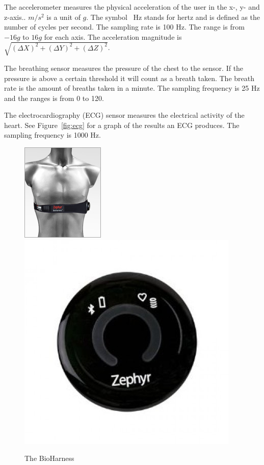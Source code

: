 			The accelerometer measures the physical acceleration of the user in the x-, y- and z-axis.. $m/s^2$ is a unit of $g$.	The symbol \SI{}{\hertz} stands for hertz and is defined as the number of cycles per second. The sampling rate is 100 Hz. The range is from $-16g$ to $16g$ for each axis. The acceleration magnitude is $\sqrt{(\Delta X)^2+(\Delta Y)^2+(\Delta Z)^2}$.

			The breathing sensor measures the pressure of the chest to the sensor. If the pressure is above a certain threshold it will count as a breath taken. The breath rate is the amount of breaths taken in a minute. The sampling frequency is 25 Hz and the ranges is from 0 to 120.

			The electrocardiography \cite{ECG} (ECG) sensor measures the electrical activity of the heart. See Figure~\ref{fig:ecg} for a graph of the results an ECG produces. The sampling frequency is 1000 Hz.

			\begin{figure}[h]
				\centering
					\includegraphics[scale=2.0]{bh.jpg}
					\includegraphics[scale=0.25]{bhclose.jpg}
					
					\caption{The BioHarness}

			\end{figure}

